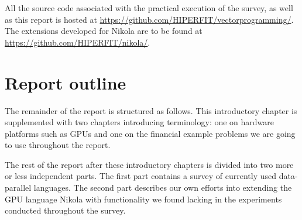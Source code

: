 





%
%

All the source code associated with the practical execution of the survey, as well as this report is hosted at
\url{https://github.com/HIPERFIT/vectorprogramming/}.
The extensions developed for Nikola are to be found at \url{https://github.com/HIPERFIT/nikola/}.

\section{Report outline}
The remainder of the report is structured as follows. This
introductory chapter is supplemented with two chapters introducing
terminology: one on hardware platforms such as GPUs and one on the
financial example problems we are going to use throughout the
report. 

The rest of the report after these introductory chapters is divided
into two more or less independent parts. The first part contains a
survey of currently used data-parallel languages. The second part
describes our own efforts into extending the GPU language Nikola with
functionality we found lacking in the experiments conducted throughout
the survey.


